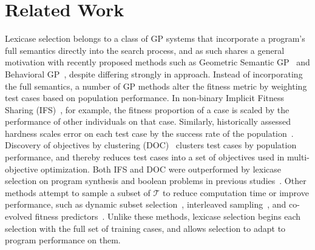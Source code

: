 \documentclass[twoside]{article}
\begin{document}
\section{Related Work}\label{s:rw}

Lexicase selection belongs to a class of GP systems that incorporate a program's full semantics directly into the search process, and as such shares a general motivation with recently proposed methods such as Geometric Semantic GP~\citep{moraglio_geometric_2012} and Behavioral GP~\citep{krawiec_behavioral_2014}, despite differing strongly in approach. Instead of incorporating the full semantics, a number of GP methods alter the fitness metric by weighting test cases based on population performance. In non-binary Implicit Fitness Sharing (IFS)~\citep{krawiec_implicit_2013}, for example, the fitness proportion of a case is scaled by the performance of other individuals on that case. Similarly, historically assessed hardness scales error on each test case by the success rate of the population~\citep{klein_genetic_2008}. Discovery of objectives by clustering (DOC)~\citep{krawiec_automatic_2015} clusters test cases by population performance, and thereby reduces test cases into a set of objectives used in multi-objective optimization. Both IFS and DOC were outperformed by lexicase selection on program synthesis and boolean problems in previous studies~\citep{helmuth_general_2015-1,liskowski_comparison_2015}. Other methods attempt to sample a subset of $\mathcal{T}$ to reduce computation time or improve performance, such as dynamic subset selection~\citep{gathercole_dynamic_1994}, interleaved sampling~\citep{goncalves_balancing_2013}, and co-evolved fitness predictors~\citep{schmidt_coevolution_2008}. Unlike these methods, lexicase selection begins each selection with the full set of training cases, and allows selection to adapt to program performance on them.
\end{document}

